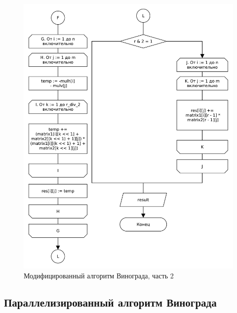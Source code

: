 \begin{figure}[H]
    \centering
    \includegraphics[scale=0.70]{pdf/owinograd-part2.pdf}
    \caption{Модифицированный алгоритм Винограда, часть 2}
    \label{img:windograd2}
\end{figure}

\subsection{Параллелизированный алгоритм Винограда}

